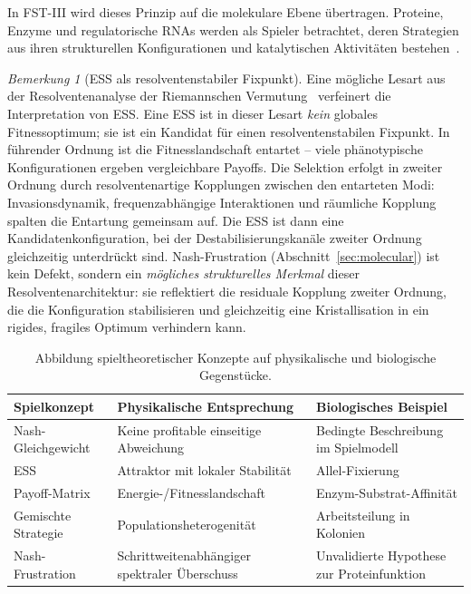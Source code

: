\documentclass[12pt,a4paper]{article}
\theoremstyle{remark}
\newtheorem{remark}{Bemerkung}
\begin{document}
In FST-III wird dieses Prinzip auf die molekulare Ebene übertragen. Proteine, Enzyme und regulatorische RNAs werden als \glqq Spieler\grqq{} betrachtet, deren \glqq Strategien\grqq{} aus ihren strukturellen Konfigurationen und katalytischen Aktivitäten bestehen~\citep{GameBiochemistry}.

\begin{remark}[ESS als resolventenstabiler Fixpunkt]
\label{rem:ess-resolvent}
Eine mögliche Lesart aus der Resolventenanalyse der Riemannschen Vermutung~\citep{GeigerRH2026b} verfeinert die Interpretation von ESS. Eine ESS ist in dieser Lesart \emph{kein} globales Fitnessoptimum; sie ist ein Kandidat für einen resolventenstabilen Fixpunkt. In führender Ordnung ist die Fitnesslandschaft entartet -- viele phänotypische Konfigurationen ergeben vergleichbare Payoffs. Die Selektion erfolgt in zweiter Ordnung durch resolventenartige Kopplungen zwischen den entarteten Modi: Invasionsdynamik, frequenzabhängige Interaktionen und räumliche Kopplung spalten die Entartung gemeinsam auf. Die ESS ist dann eine Kandidatenkonfiguration, bei der Destabilisierungskanäle zweiter Ordnung gleichzeitig unterdrückt sind. Nash-Frustration (Abschnitt~\ref{sec:molecular}) ist kein Defekt, sondern ein \emph{mögliches strukturelles Merkmal} dieser Resolventenarchitektur: sie reflektiert die residuale Kopplung zweiter Ordnung, die die Konfiguration stabilisieren und gleichzeitig eine Kristallisation in ein rigides, fragiles Optimum verhindern kann.
\end{remark}

\begin{table}[htbp]
\centering
\caption{Abbildung spieltheoretischer Konzepte auf physikalische und biologische Gegenstücke.}
\label{tab:game-biology-mapping}
\begin{tabularx}{\textwidth}{@{}L{0.18\textwidth} L{0.29\textwidth} Y@{}}
\toprule
\textbf{Spielkonzept} & \textbf{Physikalische Entsprechung} & \textbf{Biologisches Beispiel} \\
\midrule
Nash-Gleichgewicht & Keine profitable einseitige Abweichung & Bedingte Beschreibung im Spielmodell \\
ESS & Attraktor mit lokaler Stabilität & Allel-Fixierung \\
Payoff-Matrix & Energie-/Fitnesslandschaft & Enzym-Substrat-Affinität \\
Gemischte Strategie & Populationsheterogenität & Arbeitsteilung in Kolonien \\
Nash-Frustration & Schrittweitenabhängiger spektraler Überschuss & Unvalidierte Hypothese zur Proteinfunktion \\
\bottomrule
\end{tabularx}
\end{table}
\end{document}
